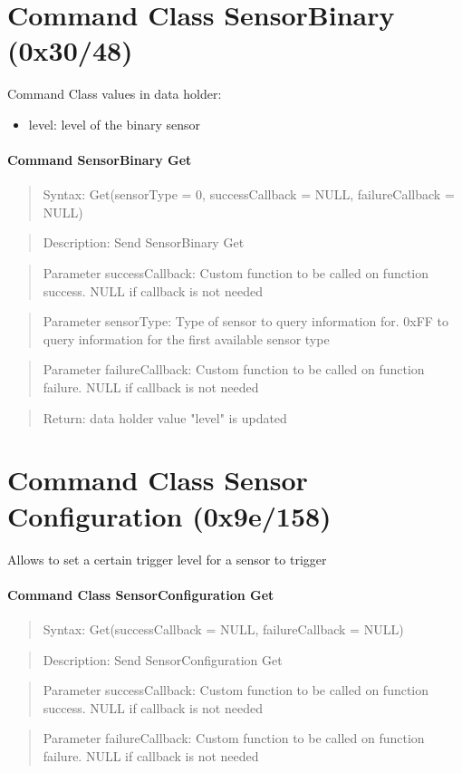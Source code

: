 \section{Command Class SensorBinary (0x30/48)}

Command Class values in data holder:
\begin{itemize}
\item level: level of the binary sensor
\end{itemize}

\paragraph {Command SensorBinary Get}
\begin{quote} Syntax: Get(sensorType = 0, successCallback = NULL, failureCallback = NULL)\end{quote}
\begin{quote} Description: Send SensorBinary Get\end{quote}
\begin{quote} Parameter successCallback: Custom function to be called on function success. NULL if callback is not needed\end{quote}
\begin{quote} Parameter sensorType: Type of sensor to query information for. 0xFF to query information for the first available sensor type\end{quote}
\begin{quote} Parameter failureCallback: Custom function to be called on function failure. NULL if callback is not needed\end{quote}
\begin{quote} Return: data holder value "level" is  updated \end{quote}


\section{Command Class Sensor Configuration (0x9e/158)}
 
Allows to set a certain trigger level for a sensor to trigger

\paragraph {Command Class SensorConfiguration Get}
\begin{quote} Syntax: Get(successCallback = NULL, failureCallback = NULL)\end{quote}
\begin{quote} Description: Send SensorConfiguration Get\end{quote}
\begin{quote} Parameter successCallback: Custom function to be called on function success. NULL if callback is not needed\end{quote}
\begin{quote} Parameter failureCallback: Custom function to be called on function failure. NULL if callback is not needed\end{quote}


